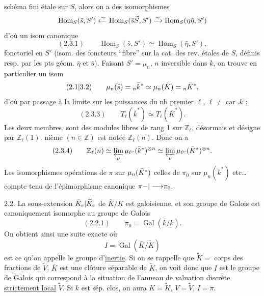 schéma fini étale sur $S$, alors on a des isomorphismes
\[
\operatorname{Hom}_S(\bar s,S')\xleftarrow{\sim}\operatorname{Hom}_S({{\bar s}}\widetilde S,S')\xrightarrow{\sim}\operatorname{Hom}_S({{\eta}}\bar\eta,S')
\]
d'où un isom canonique
\[
(2.3.1)\qquad\operatorname{Hom}_S(\bar s,S')\simeq\operatorname{Hom}_S(\bar\eta,S'),
\]
fonctoriel en $S'$ (isom. des  foncteurs ``fibre'' sur la cat. des rev. étales de $S$, définis resp. par les pts géom. $\bar\eta$ et $\bar s$). Faisant $S'=\mu_n$, $n$  inversible dans $k$, on trouve en particulier un isom
\[
(2.{1|3}.2)\qquad \mu_n(\bar s)={}_n\bar k^*\simeq\mu_n(\bar K)={}_n\bar K^*,
\]
d'où par passage à la limite sur les puissances du nb premier $\ell$, $\ell\ne\operatorname{car}.k$ :
\[
(2.3.3)\qquad T_\ell(\bar k^*)\simeq T_\ell(\bar K^*).
\]
 Les deux membres,  sont des modules libres de rang 1 sur $\mathbb Z_\ell$,   désormais et désigne par $\mathbb Z_\ell(1)$.   nième $(n\in\mathbb Z)$ est notée $\mathbb Z_\ell(n)$. Donc on a
\[
(2.3.4)\qquad \mathbb Z_\ell(n)\simeq\varprojlim_\nu\mu_{\ell^\nu}(\bar k^*)^{\otimes n}\simeq\varprojlim_\nu\mu_{\ell^\nu}(\bar K^*)^{\otimes n}.
\]
Les isomorphismes  opérations de $\pi$ sur $\mu_{{n}}(\bar K^*)$   celles de $\pi_0$ sur $\mu_n(\bar k^*)$ etc\ldots compte tenu de l'épimorphisme canonique $\pi{-|\longrightarrow}\pi_0$.

2.2. La sous-extension ${\bar K_e|\widetilde K_e}$ de $\bar K/K$ est galoisienne, et son groupe de Galois est canoniquement isomorphe au groupe de Galois
\[
(2.2.1)\qquad\pi_0=\operatorname{Gal}(\bar k/k).
\]
On obtient ainsi une suite exacte
où
\[
 I=\operatorname{Gal}(\bar K/\widetilde K)
\]
est ce qu'on appelle le groupe d'\uline{inertie}.   Si on se rappelle que $\widetilde K=$ corps des fractions de $\widetilde V$,  $\bar K$ est une clôture séparable de $\widetilde K$, on voit donc que $I$ est le groupe de Galois qui correspond à la situation  de l'anneau de valuation discrète \uline{strictement local} $\widetilde V$. Si $k$ est sép. clos, on aura $K=\widetilde K$, $V=\widetilde V$, $I=\pi$.

